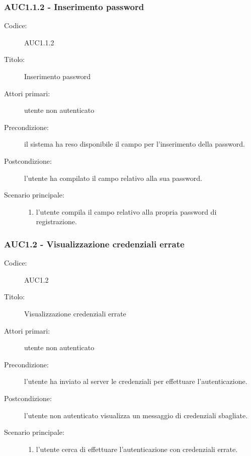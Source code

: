 \documentclass[../../../analisi-dei-requisiti.tex]{subfiles}
\begin{document}
\subsubsection{AUC1.1.2 - Inserimento password}%
\label{subsub:AUC1.1.2}
\begin{description}
  \item[Codice:] AUC1.1.2
  \item[Titolo:] Inserimento password
  \item[Attori primari:] utente non autenticato
  \item[Precondizione:] il sistema ha reso disponibile il campo per l'inserimento della password.
  \item[Postcondizione:] l'utente ha compilato il campo relativo alla sua password.
  \item[Scenario principale:]
  \begin{enumerate}
    \item l'utente compila il campo relativo alla propria password di registrazione.
  \end{enumerate}
\end{description}

\subsubsection{AUC1.2 - Visualizzazione credenziali errate}%
\label{subsub:AUC1.2}
\begin{description}
  \item[Codice:] AUC1.2
  \item[Titolo:] Visualizzazione credenziali errate
  \item[Attori primari:] utente non autenticato
  \item[Precondizione:] l'utente ha inviato al server le credenziali per effettuare l'autenticazione.
  \item[Postcondizione:] l'utente non autenticato visualizza un messaggio di credenziali sbagliate.
  \item[Scenario principale:]
  \begin{enumerate}
    \item l'utente cerca di effettuare l'autenticazione con credenziali errate.
  \end{enumerate}
\end{description}
\end{document}
